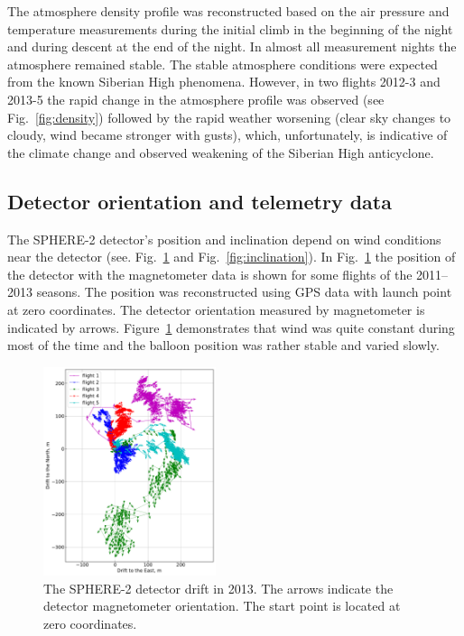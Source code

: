 \documentclass[final,5p,times,twocolumn]{elsarticle}
\begin{document}
The atmosphere density profile was reconstructed based on the air pressure and temperature measurements during the initial climb in the beginning of the night and during descent at the end of the night. In almost all measurement nights the atmosphere remained stable. The stable atmosphere conditions were expected from the known Siberian High phenomena. However, in two flights 2012-3 and 2013-5 the rapid change in the atmosphere profile was observed (see Fig.~\ref{fig:density}) followed by the rapid weather worsening (clear sky changes to cloudy, wind became stronger with gusts), which, unfortunately, is indicative of the climate change and observed weakening of the Siberian High anticyclone. 

\subsection{Detector orientation and telemetry data}
\label{sect:telemetrydata}

The \mbox{SPHERE-2} detector's position and inclination depend on wind conditions near the detector (see. Fig.~\ref{fig:gps_compass} and Fig.~\ref{fig:inclination}). In Fig.~\ref{fig:gps_compass} the position of the detector with the magnetometer data is shown for some flights of the 2011--2013 seasons. The position was reconstructed using GPS data with launch point at zero coordinates. The detector orientation measured by magnetometer is indicated by arrows. Figure~\ref{fig:gps_compass} demonstrates that wind was quite constant during most of the time and the balloon position was rather stable and varied slowly.  

\begin{figure}[tb]
    \includegraphics[width=0.45\textwidth]{GPS+quiver.pdf}\hspace{2pc}%
    \caption{The SPHERE-2 detector drift in 2013. The arrows indicate the detector magnetometer orientation. The start point is located at zero coordinates.}
\label{fig:gps_compass}
\end{figure}
\end{document}
